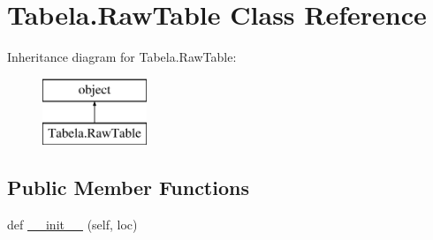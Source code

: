 \hypertarget{class_tabela_1_1_raw_table}{}\section{Tabela.\+Raw\+Table Class Reference}
\label{class_tabela_1_1_raw_table}
Inheritance diagram for Tabela.\+Raw\+Table\+:\begin{figure}[H]
\begin{center}
\leavevmode
\includegraphics[height=2.000000cm]{class_tabela_1_1_raw_table}
\end{center}
\end{figure}
\subsection*{Public Member Functions}
\begin{DoxyCompactItemize}
\item 
def \mbox{\hyperlink{class_tabela_1_1_raw_table_afceb720336b1c4ac7084cfc2719514fa}{\+\_\+\+\_\+init\+\_\+\+\_\+}} (self, loc)
\end{DoxyCompactItemize}
